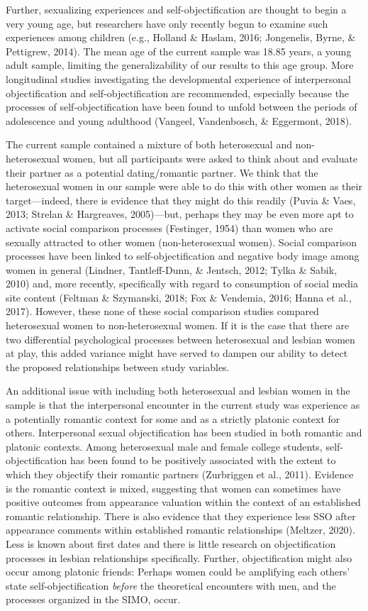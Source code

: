\documentclass[man]{apa6}
\begin{document}
Further, sexualizing experiences and self-objectification are thought to
begin a very young age, but researchers have only recently begun to
examine such experiences among children (e.g., Holland \& Haslam, 2016;
Jongenelis, Byrne, \& Pettigrew, 2014). The mean age of the current
sample was 18.85 years, a young adult sample, limiting the
generalizability of our results to this age group. More longitudinal
studies investigating the developmental experience of interpersonal
objectification and self-objectification are recommended, especially
because the processes of self-objectification have been found to unfold
between the periods of adolescence and young adulthood (Vangeel,
Vandenbosch, \& Eggermont, 2018).

The current sample contained a mixture of both heterosexual and
non-heterosexual women, but all participants were asked to think about
and evaluate their partner as a potential dating/romantic partner. We
think that the heterosexual women in our sample were able to do this
with other women as their target---indeed, there is evidence that they
might do this readily (Puvia \& Vaes, 2013; Strelan \& Hargreaves,
2005)---but, perhaps they may be even more apt to activate social
comparison processes (Festinger, 1954) than women who are sexually
attracted to other women (non-heterosexual women). Social comparison
processes have been linked to self-objectification and negative body
image among women in general (Lindner, Tantleff-Dunn, \& Jentsch, 2012;
Tylka \& Sabik, 2010) and, more recently, specifically with regard to
consumption of social media site content (Feltman \& Szymanski, 2018;
Fox \& Vendemia, 2016; Hanna et al., 2017). However, these none of these
social comparison studies compared heterosexual women to
non-heterosexual women. If it is the case that there are two
differential psychological processes between heterosexual and lesbian
women at play, this added variance might have served to dampen our
ability to detect the proposed relationships between study variables.

An additional issue with including both heterosexual and lesbian women
in the sample is that the interpersonal encounter in the current study
was experience as a potentially romantic context for some and as a
strictly platonic context for others. Interpersonal sexual
objectification has been studied in both romantic and platonic contexts.
Among heterosexual male and female college students,
self-objectification has been found to be positively associated with the
extent to which they objectify their romantic partners (Zurbriggen et
al., 2011). Evidence is the romantic context is mixed, suggesting that
women can sometimes have positive outcomes from appearance valuation
within the context of an established romantic relationship. There is
also evidence that they experience less SSO after appearance comments
within established romantic relationships (Meltzer, 2020). Less is known
about first dates and there is little research on objectification
processes in lesbian relationships specifically. Further,
objectification might also occur among platonic friends: Perhaps women
could be amplifying each others' state self-objectification
\emph{before} the theoretical encounters with men, and the processes
organized in the SIMO, occur.
\end{document}
